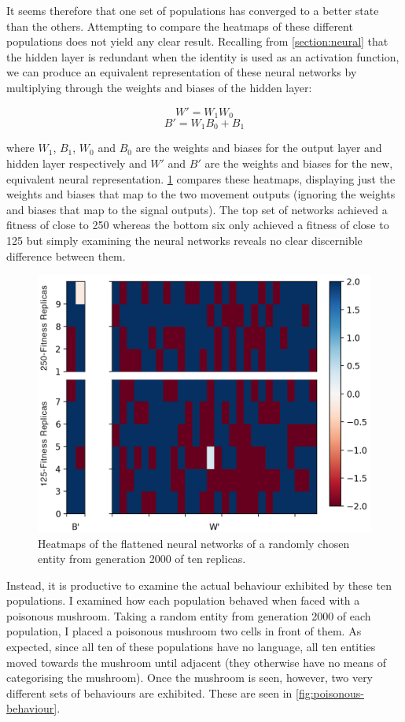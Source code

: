 \documentclass[12pt,a4paper]{report}
\begin{document}
It seems therefore that one set of populations has converged to a better state than the others. Attempting to compare the heatmaps of these different populations does not yield any clear result. Recalling from \cref{section:neural} that the hidden layer is redundant when the identity is used as an activation function, we can produce an equivalent representation of these neural networks by multiplying through the weights and biases of the hidden layer:

$$ W' = W_1 W_0 $$
$$ B' = W_1 B_0 + B_1 $$

where $W_1$, $B_1$, $W_0$ and $B_0$ are the weights and biases for the output layer and hidden layer respectively and $W'$ and $B'$ are the weights and biases for the new, equivalent neural representation. \cref{fig:compare} compares these heatmaps, displaying just the weights and biases that map to the two movement outputs (ignoring the weights and biases that map to the signal outputs). The top set of networks achieved a fitness of close to 250 whereas the bottom six only achieved a fitness of close to 125 but simply examining the neural networks reveals no clear discernible difference between them.

\begin{figure}[t]
  \centering
  \includegraphics[width=1.\linewidth]{results/compare2}
  \caption{Heatmaps of the flattened neural networks of a randomly chosen entity from generation 2000 of ten replicas.}
  \label{fig:compare}
\end{figure}

Instead, it is productive to examine the actual behaviour exhibited by these ten populations. I examined how each population behaved when faced with a poisonous mushroom. Taking a random entity from generation 2000 of each population, I placed a poisonous mushroom two cells in front of them. As expected, since all ten of these populations have no language, all ten entities moved towards the mushroom until adjacent (they otherwise have no means of categorising the mushroom). Once the mushroom is seen, however, two very different sets of behaviours are exhibited. These are seen in \cref{fig:poisonous-behaviour}.
\end{document}
